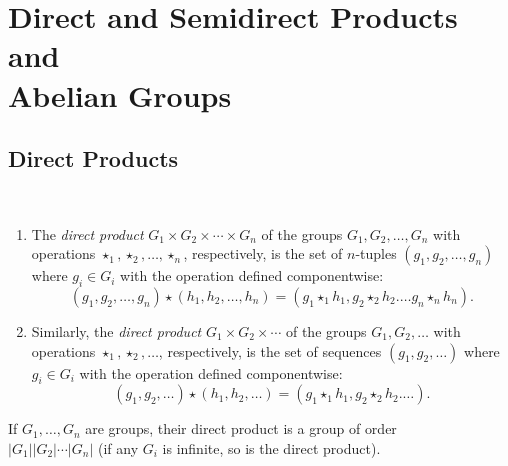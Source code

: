\documentclass[../main]{subfiles}
\begin{document}
\section{Direct and Semidirect Products and \\ Abelian Groups}


\subsection{Direct Products}


\begin{dfn}
 ~\begin{enumerate}
   \item The \textit{direct product} $G_1 \times G_2 \times \cdots \times G_n$ of the groups $G_1, G_2, \ldots , G_n$ with operations $\star_1,\star_2, \ldots , \star_n$, respectively, is the set of $n$-tuples $(g_1,g_2, \ldots , g_n)$ where $g_i\in G_i$ with the operation defined componentwise: 
   \[(g_1,g_2, \ldots ,g_n)\star (h_1,h_2, \ldots ,h_n) = (g_1 \star_1 h_1, g_2 \star_2 h_2. \ldots g_n\star_n h_n).\]
   \item Similarly, the \textit{direct product} $G_1 \times G_2 \times \cdots$ of the groups $G_1, G_2, \ldots$ with operations $\star_1,\star_2, \ldots$, respectively, is the set of sequences $(g_1,g_2, \ldots)$ where $g_i\in G_i$ with the operation defined componentwise: 
   \[(g_1,g_2, \ldots)\star (h_1,h_2, \ldots) = (g_1 \star_1 h_1, g_2 \star_2 h_2. \ldots).\]
  \end{enumerate}
\end{dfn}


\begin{prop}
 If $G_1, \ldots, G_n$ are groups, their direct product is a group of order \\ $|G_1||G_2|\cdots |G_n|$ (if any $G_i$ is infinite, so is the direct product).
\end{prop}
\end{document}
